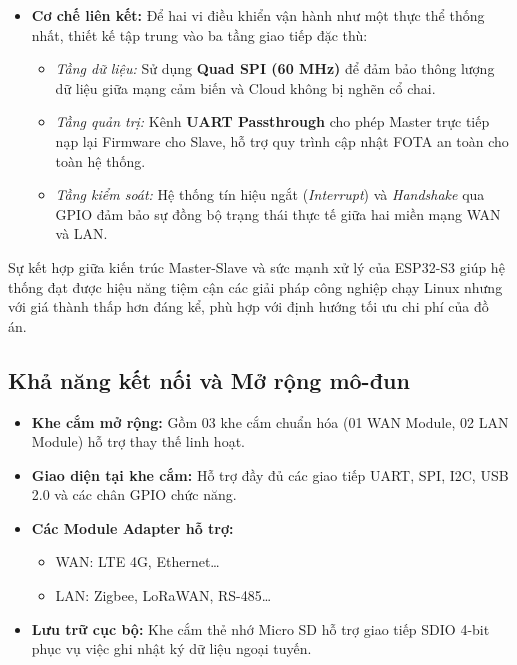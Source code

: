 \begin{itemize}
            \item \textbf{Cơ chế liên kết:} 
            Để hai vi điều khiển vận hành như một thực thể thống nhất, thiết kế tập trung vào ba tầng giao tiếp đặc thù:
            \begin{itemize}
                \item \textit{Tầng dữ liệu:} Sử dụng \textbf{Quad SPI (60 MHz)} để đảm bảo thông lượng dữ liệu giữa mạng cảm biến và Cloud không bị nghẽn cổ chai.
                \item \textit{Tầng quản trị:} Kênh \textbf{UART Passthrough} cho phép Master trực tiếp nạp lại Firmware cho Slave, hỗ trợ quy trình cập nhật FOTA an toàn cho toàn hệ thống.
                \item \textit{Tầng kiểm soát:} Hệ thống tín hiệu ngắt (\textit{Interrupt}) và \textit{Handshake} qua GPIO đảm bảo sự đồng bộ trạng thái thực tế giữa hai miền mạng WAN và LAN.
            \end{itemize}
        \end{itemize}

        Sự kết hợp giữa kiến trúc Master-Slave và sức mạnh xử lý của ESP32-S3 giúp hệ thống đạt được hiệu năng tiệm cận các giải pháp công nghiệp chạy Linux nhưng với giá thành thấp hơn đáng kể, phù hợp với định hướng tối ưu chi phí của đồ án.


    \subsection{Khả năng kết nối và Mở rộng mô-đun}
        \begin{itemize}
            \item \textbf{Khe cắm mở rộng:} Gồm 03 khe cắm chuẩn hóa (01 WAN Module, 02 LAN Module) hỗ trợ thay thế linh hoạt.
            \item \textbf{Giao diện tại khe cắm:} Hỗ trợ đầy đủ các giao tiếp UART, SPI, I2C, USB 2.0 và các chân GPIO chức năng.
            \item \textbf{Các Module Adapter hỗ trợ:}
            \begin{itemize}
                \item WAN: LTE 4G, Ethernet\dots
                \item LAN: Zigbee, LoRaWAN, RS-485\dots
            \end{itemize}
            \item \textbf{Lưu trữ cục bộ:} Khe cắm thẻ nhớ Micro SD hỗ trợ giao tiếp SDIO 4-bit phục vụ việc ghi nhật ký dữ liệu ngoại tuyến.
        \end{itemize}

